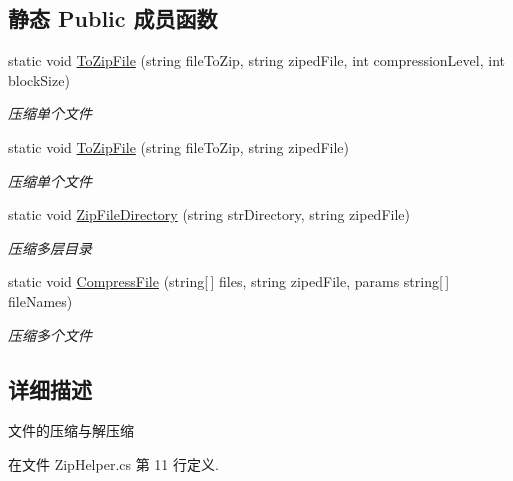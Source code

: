 \subsection*{静态 Public 成员函数}
\begin{DoxyCompactItemize}
\item 
static void \hyperlink{class_x_c_l_net_tools_1_1_file_handler_1_1_zip_helper_a4437b013f4b0db430cb1fd6097ed54a1}{To\-Zip\-File} (string file\-To\-Zip, string ziped\-File, int compression\-Level, int block\-Size)
\begin{DoxyCompactList}\small\item\em 压缩单个文件 \end{DoxyCompactList}\item 
static void \hyperlink{class_x_c_l_net_tools_1_1_file_handler_1_1_zip_helper_ab59c063455118d1eedb3a1af719db063}{To\-Zip\-File} (string file\-To\-Zip, string ziped\-File)
\begin{DoxyCompactList}\small\item\em 压缩单个文件 \end{DoxyCompactList}\item 
static void \hyperlink{class_x_c_l_net_tools_1_1_file_handler_1_1_zip_helper_a1231101acec5d274c2770115d1584ae3}{Zip\-File\-Directory} (string str\-Directory, string ziped\-File)
\begin{DoxyCompactList}\small\item\em 压缩多层目录 \end{DoxyCompactList}\item 
static void \hyperlink{class_x_c_l_net_tools_1_1_file_handler_1_1_zip_helper_abd0e8402a3d1ea9ca9f6c97cb46d5b89}{Compress\-File} (string\mbox{[}$\,$\mbox{]} files, string ziped\-File, params string\mbox{[}$\,$\mbox{]} file\-Names)
\begin{DoxyCompactList}\small\item\em 压缩多个文件 \end{DoxyCompactList}\end{DoxyCompactItemize}


\subsection{详细描述}
文件的压缩与解压缩 



在文件 Zip\-Helper.\-cs 第 11 行定义.



